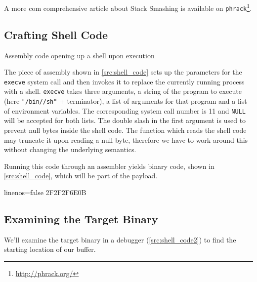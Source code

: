 \documentclass[article]{uibk}
\begin{document}
A more com comprehensive article \cite{phrack_stack_smash} about Stack Smashing
is available on \texttt{phrack}\footnote{\url{http://phrack.org/}}.

\subsection{Crafting Shell Code}

\begin{listing}[h!]
    \begin{minipage}[t]{0.4\textwidth}
    \end{minipage}\hfill
    \begin{minipage}[t]{0.5\textwidth}
    \end{minipage}
    \caption{Assembly code opening up a shell upon execution}
    \label{src:shell_code}
\end{listing}

The piece of assembly shown in \cref{src:shell_code} sets up the parameters for
the \texttt{execve} system call and then invokes it to replace the currently
running process with a shell. \texttt{execve} takes three arguments, a string
of the program to execute (here \texttt{"/bin//sh"} + terminator), a list of
arguments for that program and a list of environment variables. The
corresponding system call number is 11 and \texttt{NULL} will be accepted for
both lists. The double slash in the first argument is used to prevent null
bytes inside the shell code. The function which reads the shell code may
truncate it upon reading a null byte, therefore we have to work around this
without changing the underlying semantics.

Running this code through an assembler yields binary code, shown in
\cref{src:shell_code}, which will be part of the payload.

\begin{code*}{linenos=false}
    \x2F\x2F\x2F\x6E\x0B\xCD{}
\end{code*}

\subsection{Examining the Target Binary}

We'll examine the target binary in a debugger (\cref{src:shell_code2}) to find
the starting location of our buffer.
\end{document}
